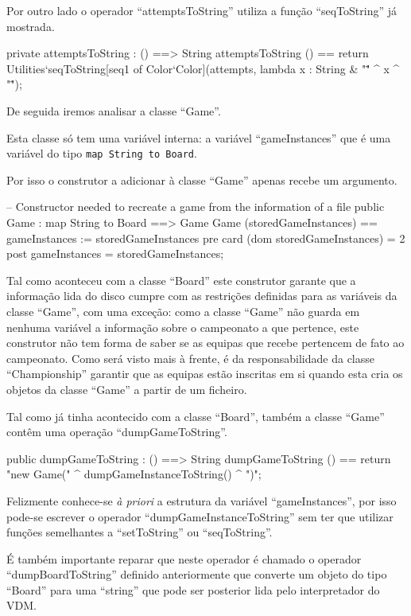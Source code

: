 Por outro lado o operador ``attemptsToString'' utiliza a função
``seqToString'' já mostrada.

\begin{vdm_al}
  private attemptsToString : () ==> String
  attemptsToString () ==
    return Utilities`seqToString[seq1 of Color`Color](attempts,
      lambda x : String & "\"" ^ x ^ "\"");
\end{vdm_al}

De seguida iremos analisar a classe ``Game''.

Esta classe só tem uma variável interna: a variável ``gameInstances''
que é uma variável do tipo \texttt{map String to Board}.

Por isso o construtor a adicionar à classe ``Game'' apenas recebe um
argumento.


\begin{vdm_al}
  -- Constructor needed to recreate a game from the information of a file
  public Game : map String to Board ==> Game
  Game (storedGameInstances) ==
    gameInstances := storedGameInstances
  pre card (dom storedGameInstances) = 2
  post gameInstances = storedGameInstances;
\end{vdm_al}

Tal como aconteceu com a classe ``Board'' este construtor garante que
a informação lida do disco cumpre com as restrições definidas para as
variáveis da classe ``Game'', com uma exceção: como a classe ``Game''
não guarda em nenhuma variável a informação sobre o campeonato a que
pertence, este construtor não tem forma de saber se as equipas que
recebe pertencem de fato ao campeonato. Como será visto mais à frente,
é da responsabilidade da classe ``Championship'' garantir que as
equipas estão inscritas em si quando esta cria os objetos da classe
``Game'' a partir de um ficheiro.

Tal como já tinha acontecido com a classe ``Board'', também a classe
``Game'' contêm uma operação ``dumpGameToString''.

\begin{vdm_al}
  public dumpGameToString : () ==> String
  dumpGameToString () == return "new Game(" ^ dumpGameInstanceToString() ^ ")";
\end{vdm_al}

Felizmente conhece-se \emph{à priori} a estrutura da variável
``gameInstances'', por isso pode-se escrever o operador
``dumpGameInstanceToString'' sem ter que utilizar funções semelhantes
a ``setToString'' ou ``seqToString''.

É também importante reparar que neste operador é chamado o operador
``dumpBoardToString'' definido anteriormente que converte um objeto do
tipo ``Board'' para uma ``string'' que pode ser posterior lida pelo
interpretador do VDM.


